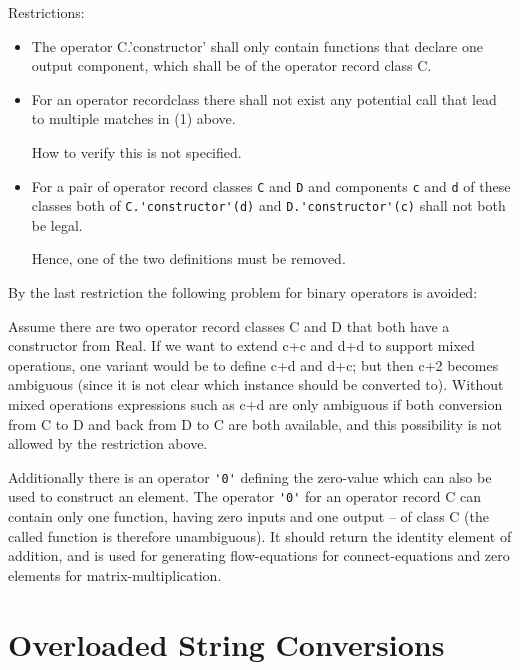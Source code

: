 Restrictions:
\begin{itemize}
\item
  The operator C.'constructor' shall only contain functions that declare
  one output component, which shall be of the operator record class C.
\item
  For an operator recordclass there shall not exist any potential call
  that lead to multiple matches in (1) above.
  \begin{nonnormative}
  How to verify this is not specified.
  \end{nonnormative}
\item
  For a pair of operator record classes \lstinline!C! and \lstinline!D! and components \lstinline!c! and \lstinline!d!
  of these classes both of \lstinline!C.'constructor'(d)! and \lstinline!D.'constructor'(c)!
  shall not both be legal.
  \begin{nonnormative}
   Hence, one of the two definitions must be removed.
  \end{nonnormative}
\end{itemize}

\begin{nonnormative}
By the last restriction the following problem for binary
operators is avoided:

Assume there are two operator record classes C and D that both
have a constructor from Real. If we want to extend c+c and d+d to
support mixed operations, one variant would be to define c+d and d+c;
but then c+2 becomes ambiguous (since it is not clear which instance
should be converted to). Without mixed operations expressions such as
c+d are only ambiguous if both conversion from C to D and back from D to
C are both available, and this possibility is not allowed by the
restriction above.
\end{nonnormative}

Additionally there is an operator \lstinline!'0'! defining the zero-value which can
also be used to construct an element. The operator \lstinline!'0'! for an operator
record C can contain only one function, having zero inputs and one
output -- of class C (the called function is therefore unambiguous). It
should return the identity element of addition, and is used for
generating flow-equations for connect-equations and zero elements for
matrix-multiplication.

\section{Overloaded String Conversions}\label{overloaded-string-conversions}

